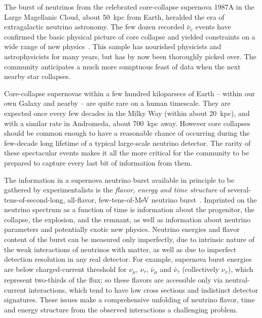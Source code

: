 


The burst of neutrinos from the celebrated core-collapse supernova 1987A in the Large Magellanic Cloud, about
50~kpc from Earth, heralded the era of extragalactic neutrino
astronomy.  The few dozen recorded $\bar{\nu}_e$ events
have confirmed the basic physical
picture of core collapse and yielded constraints on a wide range of new
physics~\cite{Schramm:1990pf, Vissani:2014doa}.   This sample has nourished physicists and
astrophysicists for many years, but has
by now been thoroughly picked over.  The community anticipates a
much more sumptuous feast of data when the next nearby star collapses.

Core-collapse supernovae within a few hundred kiloparsecs of Earth --
within our own Galaxy and nearby -- are quite rare on a human
timescale.  They are expected once every few decades in the Milky Way
(within about 20~kpc), and with a similar rate in Andromeda, about
700~kpc away.  However core collapses should be common enough to have
a reasonable chance of occurring during the few-decade long lifetime
of a typical large-scale neutrino detector.  The rarity of these
spectacular events makes it all the more critical for the community to
be prepared to capture every last bit of information from them.

The information in a supernova neutrino burst available in principle
to be gathered by experimentalists is the \textit{flavor, energy and
  time structure} of several-tens-of-second-long, all-flavor,
few-tens-of-MeV neutrino burst~\cite{Mirizzi:2015eza, Horiuchi:2017sku}.  Imprinted on
the neutrino spectrum as a function of time is information about the
progenitor, the collapse, the explosion, and the remnant, as well as
information about neutrino parameters and potentially exotic new
physics.  Neutrino energies and flavor content of the burst can be
measured only imperfectly, due to intrinsic nature of the weak
interactions of neutrinos with matter, as well as due to imperfect
detection resolution in any real detector.  For example, supernova
burst energies are below charged-current threshold for $\nu_\mu$,
$\nu_\tau$, $\bar{\nu}_\mu$ and $\bar{\nu}_{\tau}$ (collectively
$\nu_x$), which represent two-thirds of the flux; so these flavors are
accessible only via neutral-current interactions, which tend to have
low cross sections and indistinct detector signatures. These issues make a
comprehensive unfolding of neutrino flavor, time and energy structure
from the observed interactions a challenging problem.

